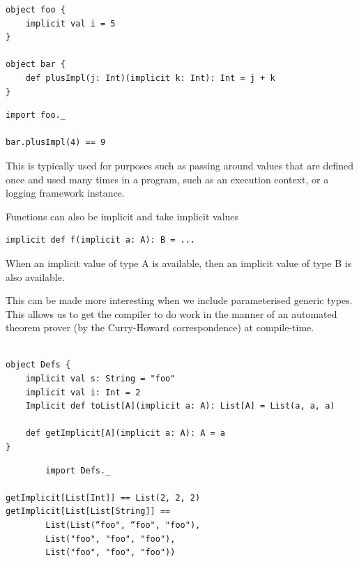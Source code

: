 \documentclass[12pt,a4paper,twoside,openright]{report}
\renewcommand{\baselinestretch}{1.1}    %
\begin{document}
\renewcommand{\baselinestretch}{0.8}
\begin{framed}
\begin{framed}
\begin{verbatim}
object foo {
    implicit val i = 5
}

object bar {
    def plusImpl(j: Int)(implicit k: Int): Int = j + k
}
\end{verbatim}
\end{framed}

\begin{framed}
\begin{verbatim}
import foo._

bar.plusImpl(4) == 9
\end{verbatim}
\end{framed}
\end{framed}
\renewcommand{\baselinestretch}{1.1}

This is typically used for purposes such as passing around values that are defined once and used many times in a program, such as an execution context, or a logging framework instance.

Functions can also be implicit and take implicit values
\begin{framed}
\begin{verbatim}
implicit def f(implicit a: A): B = ...
\end{verbatim}
When an implicit value of type A is available, then an implicit value of type B is also available.
\end{framed}

This can be made more interesting when we include parameterised generic types. This allows us to get the compiler to do work in the manner of an automated theorem prover (by the Curry-Howard correspondence) at compile-time.

\renewcommand{\baselinestretch}{0.8}
\begin{framed}
	\begin{framed}
		\begin{verbatim}
		
object Defs {
    implicit val s: String = "foo"
    implicit val i: Int = 2
    Implicit def toList[A](implicit a: A): List[A] = List(a, a, a)

    def getImplicit[A](implicit a: A): A = a
}
		\end{verbatim}
	\end{framed}
	\begin{framed}
		\begin{verbatim}
		import Defs._

getImplicit[List[Int]] == List(2, 2, 2)
getImplicit[List[List[String]] == 
        List(List(“foo", “foo", "foo"),
        List("foo", "foo", "foo"), 
        List("foo", "foo", "foo"))
		\end{verbatim}
	\end{framed}
\end{framed}
\renewcommand{\baselinestretch}{1.1}
\end{document}
